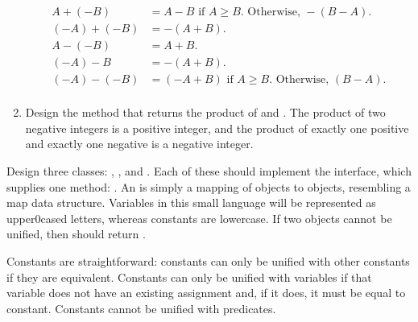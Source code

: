 \begin{enumerate}[label=(\alph*)]
  \begin{align*}
    A + (-B) &= A - B \text{ if } A \geq B. \text{ Otherwise, } -(B - A).\\
    (-A) + (-B) &= -(A + B).\\
    A - (-B) &= A + B.\\
    (-A) - B &= -(A + B).\\
    (-A) - (-B) &= (-A + B) \text{ if } A \geq B. \text{ Otherwise, } (B - A).\\
  \end{align*}

  \item Design the  method that returns the product of  and . The product of two negative integers is a positive integer, and the product of exactly one positive and exactly one negative is a negative integer.

\end{enumerate}


Design three classes: , , and . Each of these should implement the  interface, which supplies one method: . An  is simply a mapping of  objects to  objects, resembling a map data structure. Variables in this small language will be represented as upper0cased letters, whereas constants are lowercase. If two  objects cannot be unified, then  should return .

Constants are straightforward: constants can only be unified with other constants if they are equivalent. Constants can only be unified with variables if that variable does not have an existing assignment and, if it does, it must be equal to  constant. Constants cannot be unified with predicates.

